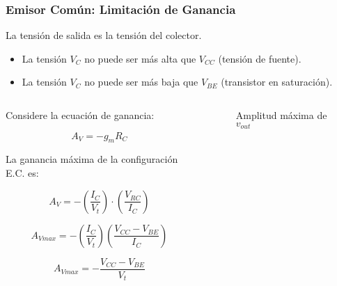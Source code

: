 \begin{frame}[t]
    \frametitle{Emisor Común: Limitación de Ganancia}

    La tensión de salida es la tensión del colector.

    \begin{itemize}
        \item La tensión $V_C$ no puede ser más alta que $V_{CC}$ (tensión de fuente).
        \item La tensión $V_C$ no puede ser más baja que $V_{BE}$ (transistor en saturación).
    \end{itemize}

    \vspace{3mm}
    \begin{columns}
        \begin{column}{0.6\textwidth}
            Considere la ecuación de ganancia:
            
            \[ A_V = -g_m R_C \]

            La ganancia máxima de la configuración E.C. es:

            \[ A_V = -\left( \dfrac{I_C}{V_t} \right) \cdot \left( \dfrac{V_{RC}}{I_C} \right) \]

            \[ A_{Vmax} = -\left( \dfrac{I_C}{V_t} \right) \left( \dfrac{V_{CC}-V_{BE}}{I_C} \right) \]

            \[ \boxed{A_{Vmax} = - \dfrac{V_{CC}-V_{BE}}{V_t}} \]
        \end{column}
        \begin{column}{0.4\textwidth}
            \begin{figure}[H]
                \caption{Amplitud máxima de $v_{out}$}
            \end{figure}
        \end{column}
    \end{columns}
\end{frame}

